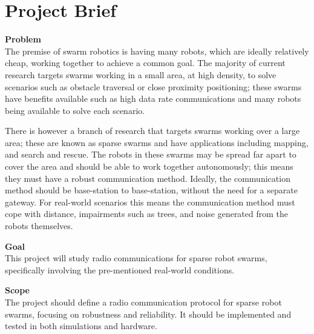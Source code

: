 \chapter{Project Brief}\label{sec:project_brief}
\textbf{Problem}\\
The premise of swarm robotics is having many robots, which are ideally relatively cheap, working together to achieve a common goal. The majority of current research targets swarms working in a small area, at high density, to solve scenarios such as obstacle traversal or close proximity positioning; these swarms have benefits available such as high data rate communications and many robots being available to solve each scenario. 

There is however a branch of research that targets swarms working over a large area; these are known as sparse swarms and have applications including mapping, and search and rescue. The robots in these swarms may be spread far apart to cover the area and should be able to work together autonomously; this means they must have a robust communication method. Ideally, the communication method should be base-station to base-station, without the need for a separate gateway. For real-world scenarios this means the communication method must cope with distance, impairments such as trees, and noise generated from the robots themselves.

\textbf{Goal}\\
This project will study radio communications for sparse robot swarms, specifically involving the pre-mentioned real-world conditions.

\textbf{Scope}\\
The project should define a radio communication protocol for sparse robot swarms, focusing on robustness and reliability. It should be implemented and tested in both simulations and hardware. 
